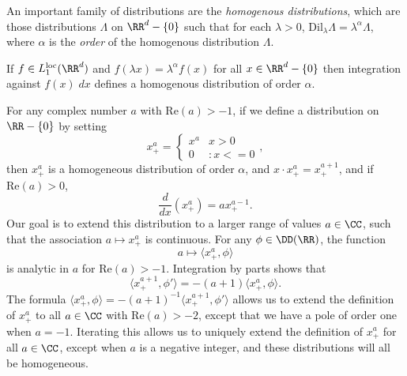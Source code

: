 An important family of distributions are the \emph{homogenous distributions}, which are those distributions $\Lambda$ on $\RR^d - \{ 0 \}$ such that for each $\lambda > 0$, $\text{Dil}_\lambda \Lambda = \lambda^\alpha \Lambda$, where $\alpha$ is the \emph{order} of the homogenous distribution $\Lambda$.

\begin{example}
  If $f \in L_1^{\text{loc}}(\RR^d)$ and $f(\lambda x) = \lambda^\alpha f(x)$ for all $x \in \RR^d - \{ 0 \}$ then integration against $f(x)\; dx$ defines a homogenous distribution of order $\alpha$.
\end{example}

\begin{example}
  For any complex number $a$ with $\text{Re}(a) > -1$, if we define a distribution on $\RR - \{ 0 \}$ by setting
  \[ x^a_+ = \begin{cases} x^a & x > 0 \\ 0 &: x <= 0 \end{cases}, \]
  then $x^a_+$ is a homogeneous distribution of order $\alpha$, and $x \cdot x^a_+ = x^{a+1}_+$, and if $\text{Re}(a) > 0$,
  \[ \frac{d}{dx} \left( x^a_+ \right) = a x^{a-1}_+. \]
  Our goal is to extend this distribution to a larger range of values $a \in \CC$, such that the association $a \mapsto x^a_+$ is continuous. For any $\phi \in \DD(\RR)$, the function
  \[ a \mapsto \langle x^a_+, \phi \rangle \]
  is analytic in $a$ for $\text{Re}(a) > -1$. Integration by parts shows that
  \[ \langle x^{a+1}_+, \phi' \rangle = - (a+1) \langle x^a_+, \phi \rangle. \]
  The formula $\langle x^a_+, \phi \rangle = -(a+1)^{-1} \langle x^{a+1}_+, \phi' \rangle$ allows us to extend the definition of $x^a_+$ to all $a \in \CC$ with $\text{Re}(a) > -2$, except that we have a pole of order one when $a = -1$. Iterating this allows us to uniquely extend the definition of $x^a_+$ for all $a \in \CC$, except when $a$ is a negative integer, and these distributions will all be homogeneous.


\end{example}
